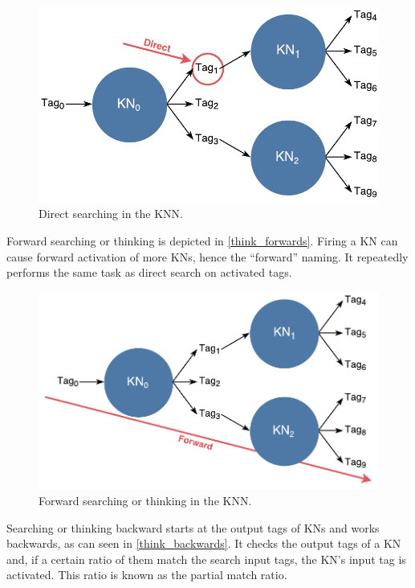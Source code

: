 \documentclass[titlepage,11pt]{article}
\begin{document}
\begin{figure}[!htb]
	\includegraphics[width=\columnwidth]{figures/direct_search.pdf}
	\caption{Direct searching in the KNN.}
	\label{fig:direct_search}
\end{figure}

Forward searching or thinking is depicted in \autoref{think_forwards}. Firing a KN can cause forward activation of more KNs, hence the ``forward'' naming. It repeatedly performs the same task as direct search on activated tags.

\begin{figure}[!htb]
	\includegraphics[width=\columnwidth]{figures/forward_search.pdf}
	\caption{Forward searching or thinking in the KNN.}
	\label{think_forwards}
\end{figure}

Searching or thinking backward starts at the output tags of KNs and works backwards, as can seen in \autoref{think_backwards}. It checks the output tags of a KN and, if a certain ratio of them match the search input tags, the KN's input tag is activated. This ratio is known as the partial match ratio.
\end{document}
